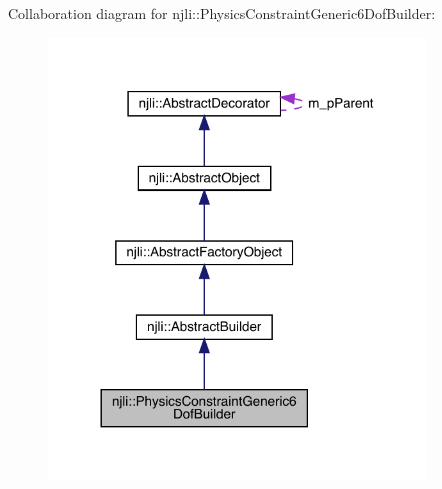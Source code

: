 Collaboration diagram for njli\+:\+:Physics\+Constraint\+Generic6\+Dof\+Builder\+:\nopagebreak
\begin{figure}[H]
\begin{center}
\leavevmode
\includegraphics[width=284pt]{classnjli_1_1_physics_constraint_generic6_dof_builder__coll__graph}
\end{center}
\end{figure}
